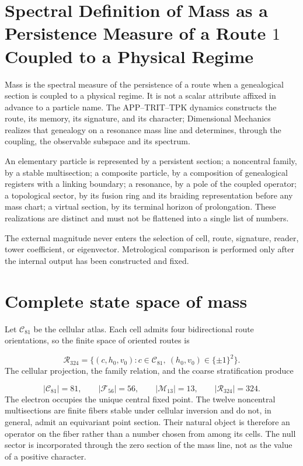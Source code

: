 \section{Spectral Definition of Mass as a Persistence Measure of a Route \(1\) Coupled to a Physical Regime}
Mass is the spectral measure of the persistence of a route when a genealogical section is coupled to a physical regime. It is not a scalar attribute affixed in advance to a particle name. The APP--TRIT--TPK dynamics constructs the route, its memory, its signature, and its character; Dimensional Mechanics realizes that genealogy on a resonance mass line and determines, through the coupling, the observable subspace and its spectrum.

An elementary particle is represented by a persistent section; a noncentral family, by a stable multisection; a composite particle, by a composition of genealogical registers with a linking boundary; a resonance, by a pole of the coupled operator; a topological sector, by its fusion ring and its braiding representation before any mass chart; a virtual section, by its terminal horizon of prolongation. These realizations are distinct and must not be flattened into a single list of numbers.

The external magnitude never enters the selection of cell, route, signature, reader, tower coefficient, or eigenvector. Metrological comparison is performed only after the internal output has been constructed and fixed.

\section{Complete state space of mass}
Let \(\mathcal C_{81}\) be the cellular atlas. Each cell admits four bidirectional route orientations, so the finite space of oriented routes is

\[
 \mathcal R_{324}
 =\{(c,h_0,v_0):c\in\mathcal C_{81},\ (h_0,v_0)\in\{\pm1\}^2\}.
\]
The cellular projection, the family relation, and the coarse stratification produce

\[
 |\mathcal C_{81}|=81,\qquad
 |\mathcal F_{56}|=56,\qquad
 |\mathcal M_{13}|=13,\qquad
 |\mathcal R_{324}|=324.
\]
The electron occupies the unique central fixed point. The twelve noncentral multisections are finite fibers stable under cellular inversion and do not, in general, admit an equivariant point section. Their natural object is therefore an operator on the fiber rather than a number chosen from among its cells. The null sector is incorporated through the zero section of the mass line, not as the value of a positive character.

